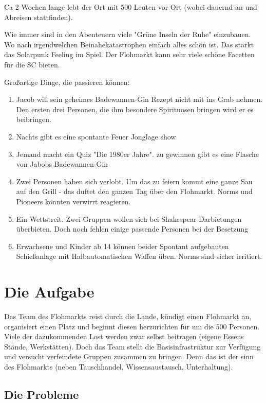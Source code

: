 \documentclass{book}
\begin{document}
Ca 2 Wochen lange lebt der Ort mit 500 Leuten vor Ort (wobei dauernd an und Abreisen stattfinden).

Wie immer sind in den Abenteuern viele "Grüne Inseln der Ruhe" einzubauen. Wo nach irgendwelchen Beinahekatastrophen einfach alles schön ist. Das stärkt das Solarpunk Feeling im Spiel. Der Flohmarkt kann sehr viele schöne Facetten für die SC bieten.

Großartige Dinge, die passieren können:

\begin{enumerate}
    \item Jacob will sein geheimes Badewannen-Gin Rezept nicht mit ins Grab nehmen. Den ersten drei Personen, die ihm besondere Spirituosen bringen wird er es beibringen.
    \item Nachts gibt es eine spontante Feuer Jonglage show
    \item Jemand macht ein Quiz "Die 1980er Jahre". zu gewinnen gibt es eine Flasche von Jabobs Badewannen-Gin
    \item Zwei Personen haben sich verlobt. Um das zu feiern kommt eine ganze Sau auf den Grill - das duftet den ganzen Tag über den Flohmarkt. Norms und Pioneers könnten verwirrt reagieren.
    \item Ein Wettstreit. Zwei Gruppen wollen sich bei Shakespear Darbietungen überbieten. Doch noch fehlen einige passende Personen bei der Besetzung
    \item Erwachsene und Kinder ab 14 können beider Spontant aufgebauten Schießanlage mit Halbautomatischen Waffen üben. Norms sind sicher irritiert.
\end{enumerate}


\chapter{Die Aufgabe}

Das Team des Flohmarkts reist durch die Lande, kündigt einen Flohmarkt an, organisiert einen Platz und beginnt diesen herzurichten für um die 500 Personen. Viele der dazukommenden Lost werden zwar selbst beitragen (eigene Essens Stände, Werkstätten).
Doch das Team stellt die Basisinfrastruktur zur Verfügung und versucht verfeindete Gruppen zusammen zu bringen. Denn das ist der sinn des Flohmarkts (neben Tauschhandel, Wissensaustausch, Unterhaltung).

\section{Die Probleme}
\end{document}
